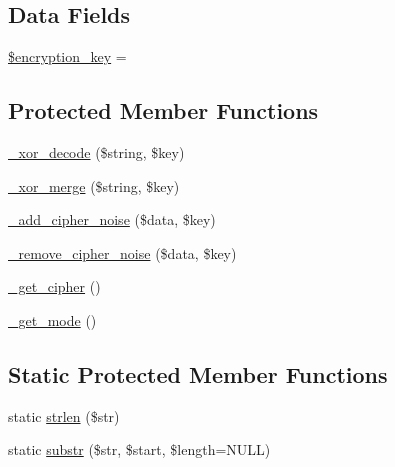 \subsection*{Data Fields}
\begin{DoxyCompactItemize}
\item 
\mbox{\hyperlink{class_c_i___encrypt_a35bbf76a5bcca90ca9b39368ed28121c}{\$encryption\+\_\+key}} = \textquotesingle{}\textquotesingle{}
\end{DoxyCompactItemize}
\subsection*{Protected Member Functions}
\begin{DoxyCompactItemize}
\item 
\mbox{\hyperlink{class_c_i___encrypt_aa0cee348c5cef9a3a06c22a92c38fd4f}{\+\_\+xor\+\_\+decode}} (\$string, \$key)
\item 
\mbox{\hyperlink{class_c_i___encrypt_aaf2644aeb5ec418eb4ddc2d70f372ada}{\+\_\+xor\+\_\+merge}} (\$string, \$key)
\item 
\mbox{\hyperlink{class_c_i___encrypt_ada423e99876a54e7bc33afc9899d01a2}{\+\_\+add\+\_\+cipher\+\_\+noise}} (\$data, \$key)
\item 
\mbox{\hyperlink{class_c_i___encrypt_a35c2675b85803d42231d1f8353fa8dac}{\+\_\+remove\+\_\+cipher\+\_\+noise}} (\$data, \$key)
\item 
\mbox{\hyperlink{class_c_i___encrypt_a663ee049f0b7596a0e4925a3eb2db062}{\+\_\+get\+\_\+cipher}} ()
\item 
\mbox{\hyperlink{class_c_i___encrypt_a8c6526d9458754249ee7268ead883a6c}{\+\_\+get\+\_\+mode}} ()
\end{DoxyCompactItemize}
\subsection*{Static Protected Member Functions}
\begin{DoxyCompactItemize}
\item 
static \mbox{\hyperlink{class_c_i___encrypt_a4c29a687d4ed62c26a10e41d98930d5f}{strlen}} (\$str)
\item 
static \mbox{\hyperlink{class_c_i___encrypt_a101caef57ef0b165da5747e2c2e6c9dc}{substr}} (\$str, \$start, \$length=N\+U\+LL)
\end{DoxyCompactItemize}
